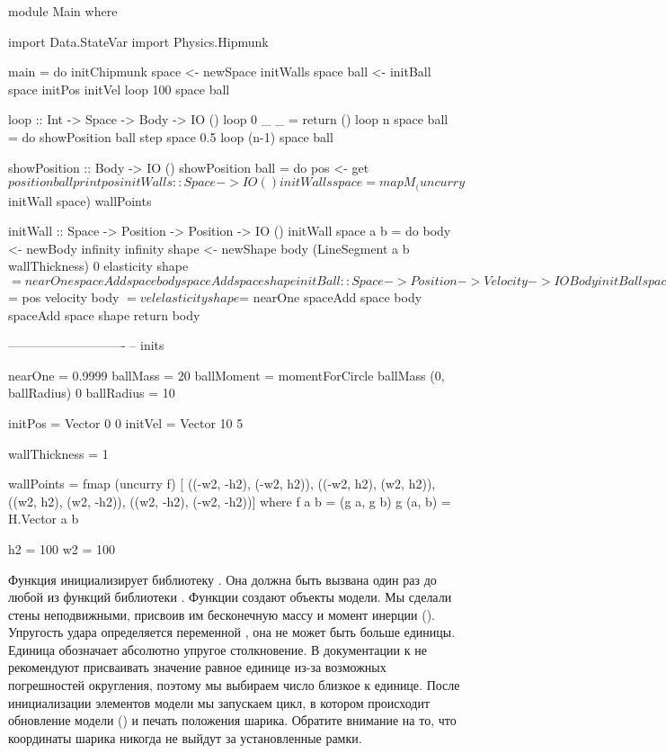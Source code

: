 \begin{code}
module Main where 

import Data.StateVar
import Physics.Hipmunk

main = do
    initChipmunk
    space <- newSpace
    initWalls space
    ball <- initBall space initPos initVel
    loop 100 space ball

loop :: Int -> Space -> Body -> IO ()
loop 0 _     _    = return ()     
loop n space ball = do
    showPosition ball
    step space 0.5
    loop (n-1) space ball
  
showPosition :: Body -> IO ()
showPosition ball = do
    pos <- get $ position ball
    print pos

initWalls :: Space -> IO ()
initWalls space = mapM_ (uncurry $ initWall space) wallPoints

initWall :: Space -> Position -> Position -> IO ()
initWall space a b = do
    body    <- newBody infinity infinity
    shape   <- newShape body (LineSegment a b wallThickness) 0
    elasticity shape $= nearOne
    spaceAdd space body
    spaceAdd space shape

initBall :: Space -> Position -> Velocity -> IO Body
initBall space pos vel = do
    body    <- newBody ballMass ballMoment 
    shape   <- newShape body (Circle ballRadius) 0
    position body $= pos
    velocity body $= vel
    elasticity shape $= nearOne
    spaceAdd space body
    spaceAdd space shape
    return body
    
----------------------------
-- inits

nearOne = 0.9999
ballMass = 20
ballMoment = momentForCircle ballMass (0, ballRadius) 0
ballRadius = 10
    
initPos = Vector 0 0
initVel = Vector 10 5

wallThickness = 1

wallPoints = fmap (uncurry f) [
    ((-w2, -h2), (-w2, h2)),
    ((-w2, h2),  (w2, h2)),
    ((w2, h2),   (w2, -h2)),
    ((w2, -h2),  (-w2, -h2))]
    where f a b = (g a, g b) 
          g (a, b) = H.Vector a b  

h2 = 100
w2 = 100
\end{code}

Функция  инициализирует библиотеку . Она
должна быть вызвана один раз до любой из функций библиотеки
. Функции  создают объекты модели.
Мы сделали стены неподвижными, присвоив им бесконечную массу и момент
инерции (). Упругость удара определяется переменной
, она не может быть больше единицы. Единица обозначает
абсолютно упругое столкновение. В документации к  не
рекомендуют присваивать значение равное единице из-за возможных
погрешностей округления, поэтому мы выбираем число близкое к единице.
После инициализации элементов модели мы запускаем цикл, в котором
происходит обновление модели () и печать положения шарика.
Обратите внимание на то, что координаты шарика никогда не выйдут за
установленные рамки.

